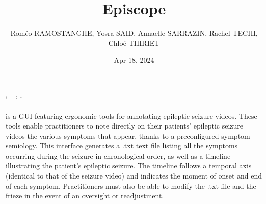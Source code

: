 \documentclass[letterpaper,10pt,english]{sphinxmanual}
\title{Episcope}
\date{Apr 18, 2024}
\author{Roméo RAMOS\sphinxhyphen{}\sphinxhyphen{}TANGHE, Yosra SAID, Annaelle SARRAZIN, Rachel TECHI, Chloé THIRIET}
\let\sphinxpxdimen\pdfpxdimen\else\newdimen\sphinxpxdimen
\begin{document}
\ifdefined\shorthandoff
  \ifnum\catcode`\=\string=\active\shorthandoff{=}\fi
  \ifnum\catcode`\"=\active{}\fi
\fi

\pagestyle{empty}
\sphinxmaketitle
\pagestyle{plain}
\sphinxtableofcontents
\pagestyle{normal}
\label{\detokenize{index::doc}}
\noindent{\hspace*{\fill}\sphinxincludegraphics[width=500\sphinxpxdimen,height=110\sphinxpxdimen]{{Logo_final}.png}\hspace*{\fill}}

\sphinxAtStartPar
{} is a GUI featuring ergonomic tools for annotating epileptic seizure videos.
These tools enable practitioners to note directly on their patients’ epileptic seizure videos the various symptoms that appear, thanks to a pre\sphinxhyphen{}configured symptom semiology. This interface generates a .txt text file listing all the symptoms occurring during the seizure in chronological order, as well as a timeline illustrating the patient’s epileptic seizure. The timeline follows a temporal axis (identical to that of the seizure video) and indicates the moment of onset and end of each symptom. Practitioners must also be able to modify the .txt file and the frieze in the event of an oversight or readjustment.

\sphinxstepscope




\begin{savenotes}\sphinxattablestart
\sphinxthistablewithglobalstyle
\sphinxthistablewithnovlinesstyle
\centering
\begin{tabulary}{\linewidth}[t]{}
\sphinxtoprule
\sphinxtableatstartofbodyhook\sphinxbottomrule
\end{tabulary}
\sphinxtableafterendhook\par
\sphinxattableend\end{savenotes}

\sphinxstepscope
\end{document}
